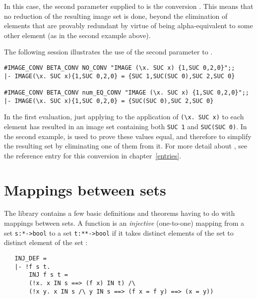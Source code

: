 \noindent In this case, the second parameter supplied to  is
the conversion . This means that no reduction of the resulting
image set is done, beyond the elimination of elements that are provably
redundant by virtue of being alpha-equivalent to some other element (as in the
second example above).

The following session illustrates the use of the second parameter to
.

\begin{session}\begin{verbatim}
#IMAGE_CONV BETA_CONV NO_CONV "IMAGE (\x. SUC x) {1,SUC 0,2,0}";;
|- IMAGE(\x. SUC x){1,SUC 0,2,0} = {SUC 1,SUC(SUC 0),SUC 2,SUC 0}

#IMAGE_CONV BETA_CONV num_EQ_CONV "IMAGE (\x. SUC x) {1,SUC 0,2,0}";;
|- IMAGE(\x. SUC x){1,SUC 0,2,0} = {SUC(SUC 0),SUC 2,SUC 0}
\end{verbatim}\end{session}

\noindent In the first evaluation, just applying  to the
application of {\small\verb!(\x. SUC x)!} to each element has resulted in an
image set containing both {\small\verb!SUC 1!} and {\small\verb!SUC(SUC 0)!}.
In the second example,  is used to prove these values equal,
and therefore to simplify the resulting set by eliminating one of them from it.
For more detail about , see the reference entry for this
conversion in chapter~\ref{entries}.%

\section{Mappings between sets}

The  library contains a few basic definitions and theorems
having to do with mappings between sets.  A function  is an {\it
injective\/} (one-to-one) mapping from a set {\small\verb!s:*->bool!} to a set
{\small\verb!t:**->bool!} if it takes distinct elements of the set  to
distinct element of the set :

\begin{hol}
\begin{verbatim}
   INJ_DEF =
   |- !f s t.
       INJ f s t =
       (!x. x IN s ==> (f x) IN t) /\
       (!x y. x IN s /\ y IN s ==> (f x = f y) ==> (x = y))
\end{verbatim}\end{hol}

